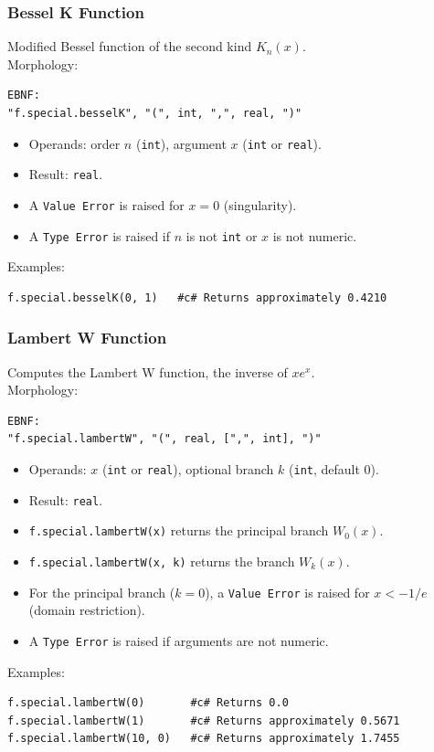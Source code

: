 \subsubsection{Bessel K Function}
Modified Bessel function of the second kind $K_n(x)$. \\
Morphology:
\begin{verbatim}
EBNF:
"f.special.besselK", "(", int, ",", real, ")"
\end{verbatim}
\begin{itemize}
\item Operands: order $n$ (\texttt{int}), argument $x$ (\texttt{int} or \texttt{real}).
\item Result: \texttt{real}.
\item A \texttt{Value Error} is raised for $x = 0$ (singularity).
\item A \texttt{Type Error} is raised if $n$ is not \texttt{int} or $x$ is not numeric.
\end{itemize}
Examples:
\begin{verbatim}
f.special.besselK(0, 1)   #c# Returns approximately 0.4210
\end{verbatim}

\subsubsection{Lambert W Function}
Computes the Lambert W function, the inverse of $x e^x$. \\
Morphology:
\begin{verbatim}
EBNF:
"f.special.lambertW", "(", real, [",", int], ")"
\end{verbatim}
\begin{itemize}
\item Operands: $x$ (\texttt{int} or \texttt{real}), optional branch $k$ (\texttt{int}, default 0).
\item Result: \texttt{real}.
\item \texttt{f.special.lambertW(x)} returns the principal branch $W_0(x)$.
\item \texttt{f.special.lambertW(x, k)} returns the branch $W_k(x)$.
\item For the principal branch ($k = 0$), a \texttt{Value Error} is raised for $x < -1/e$ (domain restriction).
\item A \texttt{Type Error} is raised if arguments are not numeric.
\end{itemize}
Examples:
\begin{verbatim}
f.special.lambertW(0)       #c# Returns 0.0
f.special.lambertW(1)       #c# Returns approximately 0.5671
f.special.lambertW(10, 0)   #c# Returns approximately 1.7455
\end{verbatim}

